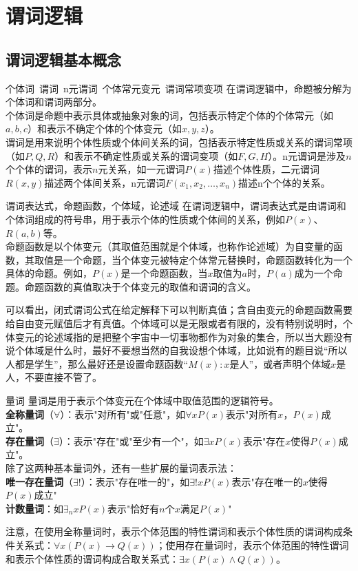 \chapter{谓词逻辑}
\section{谓词逻辑基本概念}
\begin{definition}{个体词~谓词~n元谓词~个体常元变元~谓词常项变项}{}
在谓词逻辑中，命题被分解为个体词和谓词两部分。\\
个体词是命题中表示具体或抽象对象的词，包括表示特定个体的个体常元（如$a, b, c$）和表示不确定个体的个体变元（如$x, y, z$）。\\
谓词是用来说明个体性质或个体间关系的词，包括表示特定性质或关系的谓词常项（如$P, Q, R$）和表示不确定性质或关系的谓词变项（如$F, G, H$）。n元谓词是涉及$n$个个体的谓词，表示$n$元关系，如一元谓词$P(x)$描述个体性质，二元谓词$R(x,y)$描述两个体间关系，n元谓词$F(x_1,x_2,\ldots,x_n)$描述n个个体的关系。
\end{definition}
\begin{definition}{谓词表达式，命题函数，个体域，论述域}{}
在谓词逻辑中，谓词表达式是由谓词和个体词组成的符号串，用于表示个体的性质或个体间的关系，例如$P(x)$、$R(a, b)$等。\\
命题函数是以个体变元（其取值范围就是个体域，也称作论述域）为自变量的函数，其取值是一个命题，当个体变元被特定个体常元替换时，命题函数转化为一个具体的命题。例如，$P(x)$是一个命题函数，当$x$取值为$a$时，$P(a)$成为一个命题。命题函数的真值取决于个体变元的取值和谓词的含义。
\end{definition}
可以看出，闭式谓词公式在给定解释下可以判断真值；含自由变元的命题函数需要给自由变元赋值后才有真值。个体域可以是无限或者有限的，没有特别说明时，个体变元的论述域指的是把整个宇宙中一切事物都作为对象的集合，所以当大题没有说个体域是什么时，最好不要想当然的自我设想个体域，比如说有的题目说“所以人都是学生”，那么最好还是设置命题函数“$M(x):x$是人”，或者声明个体域$x$是人，不要直接不管了。
\begin{definition}{量词}{}
量词是用于表示个体变元在个体域中取值范围的逻辑符号。\\
\textbf{全称量词}（$\forall$）：表示"对所有"或"任意"，如$\forall x P(x)$表示"对所有$x$，$P(x)$成立"。\\
\textbf{存在量词}（$\exists$）：表示"存在"或"至少有一个"，如$\exists x P(x)$表示"存在$x$使得$P(x)$成立"。\\
除了这两种基本量词外，还有一些扩展的量词表示法：\\
\textbf{唯一存在量词}（$\exists!$）：表示"存在唯一的"，如$\exists! x P(x)$表示"存在唯一的$x$使得$P(x)$成立"\\
\textbf{计数量词}：如$\exists_n x P(x)$表示"恰好有$n$个$x$满足$P(x)$"
\end{definition}
注意，在使用全称量词时，表示个体范围的特性谓词和表示个体性质的谓词构成条件关系式：$\forall x (P(x) \rightarrow Q(x))$；使用存在量词时，表示个体范围的特性谓词和表示个体性质的谓词构成合取关系式：$\exists x (P(x) \land Q(x))$。

